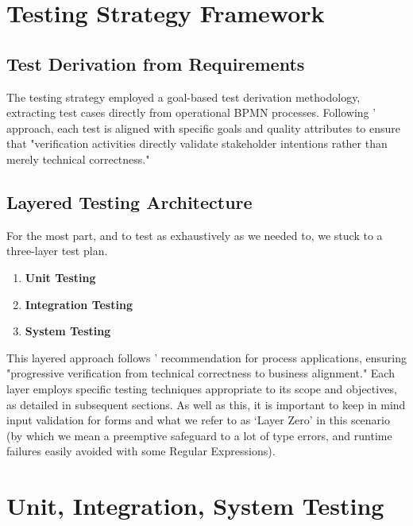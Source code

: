 \documentclass[14pt,a4paper]{article}
\begin{document}
\section{Testing Strategy Framework}

\subsection{Test Derivation from Requirements}

The testing strategy employed a goal-based test derivation methodology, extracting test cases directly from operational BPMN processes. Following \textit{\parencite[p. 176]{Kunze2015}}' approach, each test is aligned with specific goals and quality attributes to ensure that "verification activities directly validate stakeholder intentions rather than merely technical correctness."

\subsection{Layered Testing Architecture}

For the most part, and to test as exhaustively as we needed to, we stuck to a three-layer test plan.

\begin{enumerate}
    \item \textbf{Unit Testing}
    \item \textbf{Integration Testing}
    \item \textbf{System Testing}
\end{enumerate}

This layered approach follows \textit{\parencite[p. 92]{Garcia-Borgonon2017}}' recommendation for process applications, ensuring "progressive verification from technical correctness to business alignment." Each layer employs specific testing techniques appropriate to its scope and objectives, as detailed in subsequent sections. As well as this, it is important to keep in mind input validation for forms and what we refer to as `Layer Zero' in this scenario (by which we mean a preemptive safeguard to a lot of type errors, and runtime failures easily avoided with some Regular Expressions).

\section{Unit, Integration, System Testing}
\end{document}
